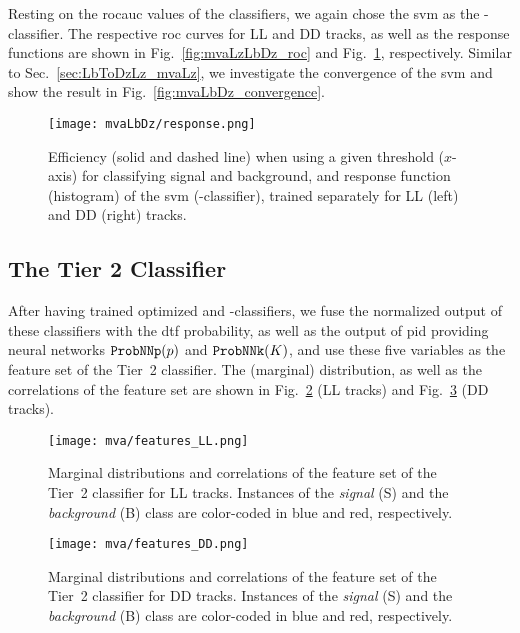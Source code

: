 Resting on the \gls{rocauc} values of the classifiers, we again chose the \gls{svm} as the \Lb-\Dz classifier.
The respective \gls{roc} curves for \gls{LL} and \gls{DD} tracks, as well as the response functions are shown in Fig.~\ref{fig:mvaLzLbDz_roc} and Fig.~\ref{fig:mvaLbDz_response}, respectively.
Similar to Sec.~\ref{sec:LbToDzLz_mvaLz}, we investigate the convergence of the \gls{svm} and show the result in Fig.~\ref{fig:mvaLbDz_convergence}.

\begin{figure}[htbp]
    \centering
    \texttt{[image: mvaLbDz/response.png]}
    \caption{Efficiency (solid and dashed line) when using a given threshold ($x$-axis) for classifying signal and background, and response function (histogram) of the \gls{svm} (\Lb-\Dz classifier), trained separately for \gls{LL} (left) and \gls{DD} (right) tracks.}
    \label{fig:mvaLbDz_response}
\end{figure}

\subsection{The Tier 2 Classifier}
After having trained optimized \Lz and \Lb-\Dz classifiers, we fuse the normalized output of these classifiers with the \gls{dtf} probability, as well as the output of \gls{pid} providing neural networks $\texttt{ProbNNp}({p})$ and $\texttt{ProbNNk}({K})$, and use these five variables as the feature set of the Tier~2 classifier.
The (marginal) distribution, as well as the correlations of the feature set are shown in Fig.~\ref{fig:mva_features_LL} (\gls{LL} tracks) and Fig.~\ref{fig:mva_features_DD} (\gls{DD} tracks).
\begin{figure}[htbp]
    \centering
    \texttt{[image: mva/features\_LL.png]}
    \caption{Marginal distributions and correlations of the feature set of the Tier~2 classifier for \gls{LL} tracks. Instances of the \textit{signal} (S) and the \textit{background} (B) class are color-coded in blue and red, respectively.}
    \label{fig:mva_features_LL}
\end{figure}

\begin{figure}[htbp]
    \centering
    \texttt{[image: mva/features\_DD.png]}
    \caption{Marginal distributions and correlations of the feature set of the Tier~2 classifier for \gls{DD} tracks. Instances of the \textit{signal} (S) and the \textit{background} (B) class are color-coded in blue and red, respectively.}
    \label{fig:mva_features_DD}
\end{figure}

